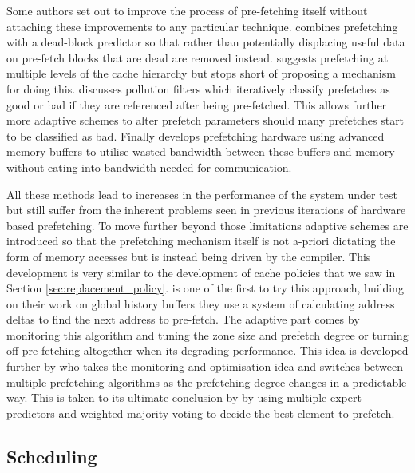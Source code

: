 Some authors set out to improve the process of pre-fetching itself without attaching these improvements to any particular technique. \citet{laiDeadblockPredictionDeadblock2001} combines prefetching with a dead-block predictor so that rather than potentially displacing useful data on pre-fetch blocks that are dead are removed instead. \citet{frittsMultilevelMemoryPrefetching2002a} suggests prefetching at multiple levels of the cache hierarchy but stops short of proposing a mechanism for doing this. \citet{zhuangHardwarebasedCachePollution2003} discusses pollution filters which iteratively classify prefetches as good or bad if they are referenced after being pre-fetched. This allows further more adaptive schemes to alter prefetch parameters should many prefetches start to be classified as bad. Finally \citet{linDRAMLevelPrefetchingFullyBuffered2007a} develops prefetching hardware using advanced memory buffers to utilise wasted bandwidth between these buffers and memory without eating into bandwidth needed for communication. 

All these methods lead to increases in the performance of the system under test but still suffer from the inherent problems seen in previous iterations of hardware based prefetching. To move further beyond those limitations adaptive schemes are introduced so that the prefetching mechanism itself is not a-priori dictating the form of memory accesses but is instead being driven by the compiler. This development is very similar to the development of cache policies that we saw in Section \ref{sec:replacement_policy}. \citet{nesbitACDCAdaptive2004} is one of the first to try this approach, building on their work on global history buffers \cite{nesbitDataCachePrefetching2004} they use a system of calculating address deltas to find the next address to pre-fetch. The adaptive part comes by monitoring this algorithm and tuning the zone size and prefetch degree or turning off pre-fetching altogether when its degrading performance. This idea is developed further by \citet{aroraCompositeDataPrefetcher2014} who takes the monitoring and optimisation idea and switches between multiple prefetching algorithms as the prefetching degree changes in a predictable way. This is taken to its ultimate conclusion by \citet{pandaExpertPrefetchPrediction2016} by using multiple expert predictors and weighted majority voting to decide the best element to prefetch.

\subsection{Scheduling}

